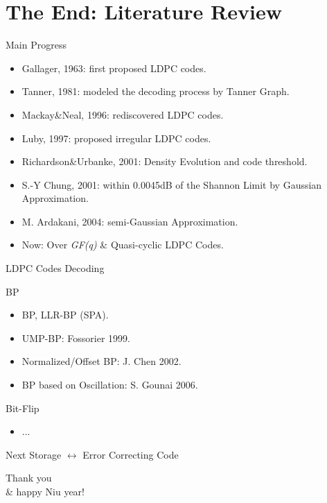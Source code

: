 \documentclass{beamer}
\newcommand{\xieti}{\textsl}
\begin{document}
\section{The End: Literature Review}
\begin{frame}{Main Progress}
    \begin{itemize}
    \item Gallager, 1963: first proposed LDPC codes.
    \item Tanner, 1981: modeled the decoding process by  Tanner Graph.
    \item Mackay\&Neal, 1996: rediscovered LDPC codes.
    \item Luby, 1997: proposed irregular LDPC codes.
    \item Richardson\&Urbanke, 2001: Density Evolution and code threshold.
    \item S.-Y Chung, 2001: within 0.0045dB of the Shannon Limit by Gaussian Approximation.
    \item M. Ardakani, 2004: semi-Gaussian Approximation.
    \item Now: Over \xieti{GF(q)} \& Quasi-cyclic LDPC Codes.
    \end{itemize}
\end{frame}
\begin{frame}{LDPC Codes Decoding}
    \begin{block}{BP}
        \begin{itemize}
        \item BP, LLR-BP (SPA).
        \item UMP-BP: Fossorier 1999.
        \item Normalized/Offset BP: J. Chen 2002.
        \item BP based on Oscillation: S. Gounai 2006.
        \end{itemize}
    \end{block}
    \begin{block}{Bit-Flip}
        \begin{itemize}
        \item ...
        \end{itemize}
    \end{block}
    \begin{block}{Next}
        Storage $\leftrightarrow$ Error Correcting Code
    \end{block}
\end{frame}
\begin{frame}
    \begin{center}
        \huge{Thank you \\\& happy Niu year!}
    \end{center}
\end{frame}
\end{document}
